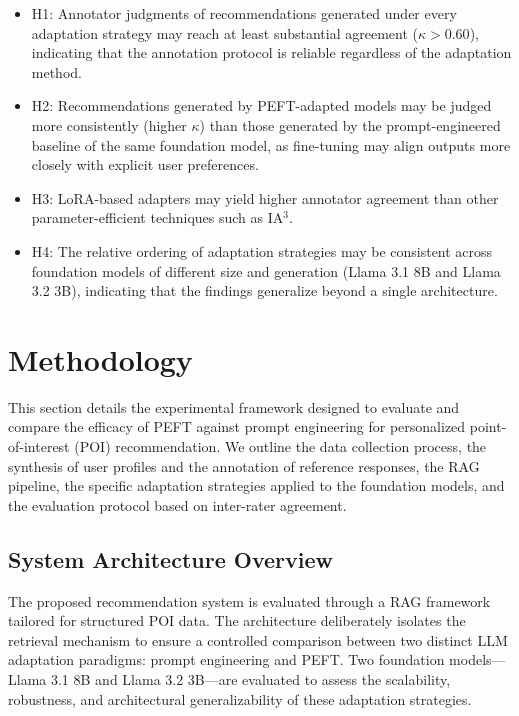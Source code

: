 \documentclass[journal,article,submit,pdftex,moreauthors]{Definitions/mdpi}
\begin{document}
\begin{itemize}
\item H1: Annotator judgments of recommendations generated under every adaptation strategy may reach at least substantial agreement ($\kappa > 0.60$), indicating that the annotation protocol is reliable regardless of the adaptation method.

\item H2: Recommendations generated by PEFT-adapted models may be judged more consistently (higher $\kappa$) than those generated by the prompt-engineered baseline of the same foundation model, as fine-tuning may align outputs more closely with explicit user preferences.

\item H3: LoRA-based adapters may yield higher annotator agreement than other parameter-efficient techniques such as IA$^3$.

\item H4: The relative ordering of adaptation strategies may be consistent across foundation models of different size and generation (Llama 3.1 8B and Llama 3.2 3B), indicating that the findings generalize beyond a single architecture.
\end{itemize}

\section{Methodology}

This section details the experimental framework designed to evaluate and compare the efficacy of PEFT against prompt engineering for personalized point-of-interest (POI) recommendation. We outline the data collection process, the synthesis of user profiles and the annotation of reference responses, the RAG pipeline, the specific adaptation strategies applied to the foundation models, and the evaluation protocol based on inter-rater agreement.

\subsection{System Architecture Overview}

The proposed recommendation system is evaluated through a RAG framework tailored for structured POI data. The architecture deliberately isolates the retrieval mechanism to ensure a controlled comparison between two distinct LLM adaptation paradigms: prompt engineering and PEFT. Two foundation models—Llama 3.1 8B and Llama 3.2 3B—are evaluated to assess the scalability, robustness, and architectural generalizability of these adaptation strategies.
\end{document}
